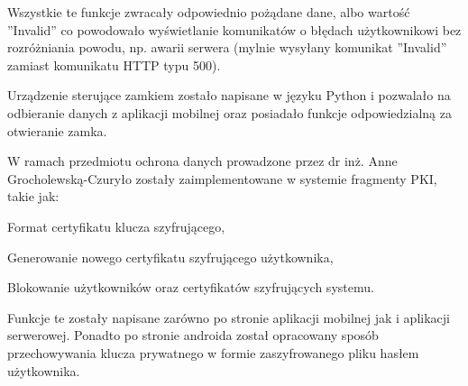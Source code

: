 	Wszystkie te funkcje zwracały odpowiednio pożądane dane, albo wartość ''Invalid'' co powodowało wyświetlanie komunikatów o błędach użytkownikowi bez rozróżniania powodu, np. awarii serwera (mylnie wysyłany komunikat ''Invalid'' zamiast komunikatu HTTP typu 500).
	
	Urządzenie sterujące zamkiem zostało napisane w języku Python i pozwalało na odbieranie danych z aplikacji mobilnej oraz posiadało funkcje odpowiedzialną za otwieranie zamka.

	W ramach przedmiotu ochrona danych prowadzone przez dr inż. Anne Grocholewską-Czuryło zostały zaimplementowane w systemie fragmenty PKI, takie jak:
	   \begin{itemize*}
	   	\item Format certyfikatu klucza szyfrującego,
	   	\item Generowanie nowego certyfikatu szyfrującego użytkownika,
	   	\item Blokowanie użytkowników oraz certyfikatów szyfrujących systemu.
	   \end{itemize*}
   
	 Funkcje te zostały napisane zarówno po stronie aplikacji mobilnej jak i aplikacji serwerowej. Ponadto po stronie androida został opracowany sposób przechowywania klucza prywatnego w formie zaszyfrowanego pliku hasłem użytkownika.

